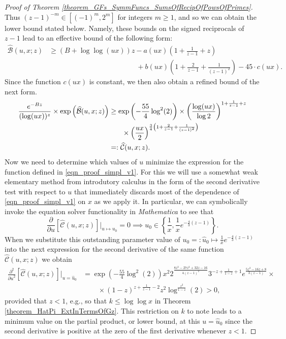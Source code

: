 \documentclass[11pt,reqno,a4letter]{article}
\numberwithin{figure}{section}
\numberwithin{table}{section}
\theoremstyle{plain}
\numberwithin{theorem}{section}
\theoremstyle{definition}
\begin{document}
\begin{proof}[Proof of Theorem \ref{theorem_GFs_SymmFuncs_SumsOfRecipOfPowsOfPrimes}]
Thus $(z-1)^{-m} \in [(-1)^m, 2^m]$ for integers $m \geq 1$, and so we can obtain the 
lower bound stated below. Namely, these bounds on the signed reciprocals of $z-1$ 
lead to an effective bound of the following form: 
\begin{align*} 
\widehat{\mathcal{B}}(u, x; z) & \geq (B + \log\log (ux)) z - a(ux) \left(1 + \frac{1}{z-1} + z\right) \\ 
     & \phantom{= (B + \log\log (ux)) z\ } + 
     b(ux) \left( 
     1 + \frac{2}{z-1} + \frac{1}{(z-1)^2}\right) - 
     45 \cdot c(ux). 
\end{align*} 
Since the function $c(ux)$ is constant, we then also obtain a refined bound of the next form. 
\begin{align} 
\notag 
\frac{e^{-Bz}}{(\log (ux))^{z}} \times \exp\left(\widehat{\mathcal{B}}(u, x; z)\right) & \geq 
    \exp\left(-\frac{55}{4} \log^2(2)\right) \times \left(\frac{\log(ux)}{\log 2}\right)^{1 + \frac{1}{z-1} + z} \\ 
\notag 
    & \phantom{\geq \times} \times \left(\frac{ux}{2}\right)^{\frac{3}{4}\left(1 + \frac{2}{z-1} + \frac{1}{(z-1)^2}\right)} \\ 
\label{eqn_proof_simpl_v1} 
     & =: \widehat{\mathcal{C}}(u, x; z). 
\end{align} 
Now we need to determine which values of $u$ minimize the expression for the function defined 
in \eqref{eqn_proof_simpl_v1}. 
For this we will use a somewhat weak elementary method from 
introdutory calculus in the form of the second derivative test with respect to $u$ that 
immediately discards most of the 
dependence of \eqref{eqn_proof_simpl_v1} on $x$ as we apply it. 
In particular, we can symbolically invoke the equation solver functionality in \emph{Mathematica} 
to see that 
\[
\frac{\partial}{\partial u}\left[\widehat{\mathcal{C}}(u, x; z)\right] \Biggr\rvert_{u \mapsto u_0} = 0 \implies 
     u_0 \in \left\{\frac{1}{x}, \frac{1}{x} e^{-\frac{4}{3}(z-1)}\right\}. 
\]
When we substitute this outstanding parameter value of $u_0 =: \hat{u}_0 \mapsto \frac{1}{x} e^{-\frac{4}{3}(z-1)}$ 
into the next expression for the second derivative of the same function 
$\widehat{\mathcal{C}}(u, x; z)$ we obtain 
\begin{align*} 
\frac{\partial^2}{{\partial u}^2}\left[\widehat{\mathcal{C}}(u, x; z)\right] \Biggr\rvert_{u = \hat{u}_0} & = 
     \exp\left(-\frac{55}{4} \log^2(2)\right) x^2 2^{\frac{8 z^3-27 z^2+32 z-16}{4 (z-1)^2}} 
     3^{-z+\frac{1}{1-z}+1} e^{\frac{5 z^2-16 z+8}{3 (z-1)}} \times \\ 
     & \phantom{=\times} \times (1-z)^{z+\frac{1}{z-1}-2} z^2
     \log^{\frac{z^2}{1-z}}(2) > 0, 
\end{align*} 
provided that $z < 1$, e.g., so that $k \leq \log\log x$ in Theorem \ref{theorem_HatPi_ExtInTermsOfGz}. 
This restriction on $k$ to note 
leads to a minimum value on the partial product, or lower bound, at this $u = \hat{u}_0$ 
since the second derivative is positive at the zero of the first derivative whenever $z < 1$. 


\end{proof}
\end{document}
